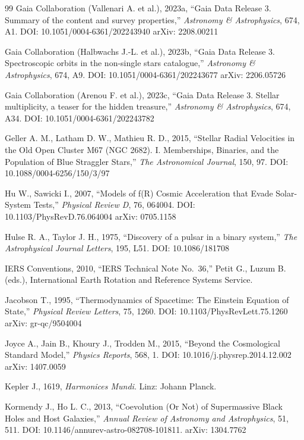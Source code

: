 \documentclass[10pt,a4paper]{article}
\begin{document}
\begin{thebibliography}{99}
Gaia Collaboration (Vallenari A. et al.), 2023a, ``Gaia Data Release 3. Summary of the content and survey properties,'' \emph{Astronomy \& Astrophysics}, 674, A1. DOI: 10.1051/0004-6361/202243940 arXiv: 2208.00211

Gaia Collaboration (Halbwachs J.-L. et al.), 2023b, ``Gaia Data Release 3. Spectroscopic orbits in the non-single stars catalogue,'' \emph{Astronomy \& Astrophysics}, 674, A9. DOI: 10.1051/0004-6361/202243677 arXiv: 2206.05726

Gaia Collaboration (Arenou F. et al.), 2023c, ``Gaia Data Release 3. Stellar multiplicity, a teaser for the hidden treasure,'' \emph{Astronomy \& Astrophysics}, 674, A34. DOI: 10.1051/0004-6361/202243782

Geller A. M., Latham D. W., Mathieu R. D., 2015, ``Stellar Radial Velocities in the Old Open Cluster M67 (NGC 2682). I. Memberships, Binaries, and the Population of Blue Straggler Stars,'' \emph{The Astronomical Journal}, 150, 97. DOI: 10.1088/0004-6256/150/3/97

Hu W., Sawicki I., 2007, ``Models of f(R) Cosmic Acceleration that Evade Solar-System Tests,'' \emph{Physical Review D}, 76, 064004. DOI: 10.1103/PhysRevD.76.064004 arXiv: 0705.1158

Hulse R. A., Taylor J. H., 1975, ``Discovery of a pulsar in a binary system,'' \emph{The Astrophysical Journal Letters}, 195, L51. DOI: 10.1086/181708

IERS Conventions, 2010, ``IERS Technical Note No.~36,'' Petit G., Luzum B. (eds.), International Earth Rotation and Reference Systems Service.

Jacobson T., 1995, ``Thermodynamics of Spacetime: The Einstein Equation of State,'' \emph{Physical Review Letters}, 75, 1260. DOI: 10.1103/PhysRevLett.75.1260 arXiv: gr-qc/9504004

Joyce A., Jain B., Khoury J., Trodden M., 2015, ``Beyond the Cosmological Standard Model,'' \emph{Physics Reports}, 568, 1. DOI: 10.1016/j.physrep.2014.12.002 arXiv: 1407.0059

Kepler J., 1619, \emph{Harmonices Mundi}. Linz: Johann Planck.

Kormendy J., Ho L. C., 2013, ``Coevolution (Or Not) of Supermassive Black Holes and Host Galaxies,'' \emph{Annual Review of Astronomy and Astrophysics}, 51, 511. DOI: 10.1146/annurev-astro-082708-101811. arXiv: 1304.7762


\end{thebibliography}
\end{document}
